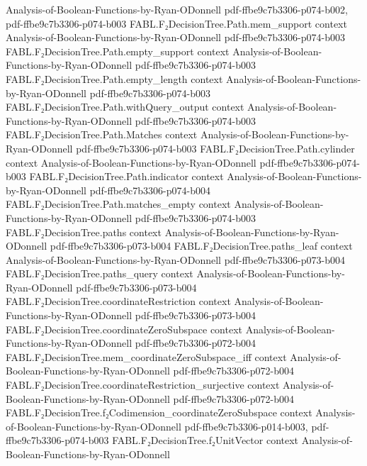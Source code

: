 \begin{theorem}
  {Analysis-of-Boolean-Functions-by-Ryan-ODonnell}
  {pdf-ffbe9c7b3306-p074-b002,
    pdf-ffbe9c7b3306-p074-b003}
\proofstep
  {FABL.F₂DecisionTree.Path.mem_support}
  {context}
  {Analysis-of-Boolean-Functions-by-Ryan-ODonnell}
  {pdf-ffbe9c7b3306-p074-b003}
\proofstep
  {FABL.F₂DecisionTree.Path.empty_support}
  {context}
  {Analysis-of-Boolean-Functions-by-Ryan-ODonnell}
  {pdf-ffbe9c7b3306-p074-b003}
\proofstep
  {FABL.F₂DecisionTree.Path.empty_length}
  {context}
  {Analysis-of-Boolean-Functions-by-Ryan-ODonnell}
  {pdf-ffbe9c7b3306-p074-b003}
\proofstep
  {FABL.F₂DecisionTree.Path.withQuery_output}
  {context}
  {Analysis-of-Boolean-Functions-by-Ryan-ODonnell}
  {pdf-ffbe9c7b3306-p074-b003}
\proofstep
  {FABL.F₂DecisionTree.Path.Matches}
  {context}
  {Analysis-of-Boolean-Functions-by-Ryan-ODonnell}
  {pdf-ffbe9c7b3306-p074-b003}
\proofstep
  {FABL.F₂DecisionTree.Path.cylinder}
  {context}
  {Analysis-of-Boolean-Functions-by-Ryan-ODonnell}
  {pdf-ffbe9c7b3306-p074-b003}
\proofstep
  {FABL.F₂DecisionTree.Path.indicator}
  {context}
  {Analysis-of-Boolean-Functions-by-Ryan-ODonnell}
  {pdf-ffbe9c7b3306-p074-b004}
\proofstep
  {FABL.F₂DecisionTree.Path.matches_empty}
  {context}
  {Analysis-of-Boolean-Functions-by-Ryan-ODonnell}
  {pdf-ffbe9c7b3306-p074-b003}
\proofstep
  {FABL.F₂DecisionTree.paths}
  {context}
  {Analysis-of-Boolean-Functions-by-Ryan-ODonnell}
  {pdf-ffbe9c7b3306-p073-b004}
\proofstep
  {FABL.F₂DecisionTree.paths_leaf}
  {context}
  {Analysis-of-Boolean-Functions-by-Ryan-ODonnell}
  {pdf-ffbe9c7b3306-p073-b004}
\proofstep
  {FABL.F₂DecisionTree.paths_query}
  {context}
  {Analysis-of-Boolean-Functions-by-Ryan-ODonnell}
  {pdf-ffbe9c7b3306-p073-b004}
\proofstep
  {FABL.F₂DecisionTree.coordinateRestriction}
  {context}
  {Analysis-of-Boolean-Functions-by-Ryan-ODonnell}
  {pdf-ffbe9c7b3306-p073-b004}
\proofstep
  {FABL.F₂DecisionTree.coordinateZeroSubspace}
  {context}
  {Analysis-of-Boolean-Functions-by-Ryan-ODonnell}
  {pdf-ffbe9c7b3306-p072-b004}
\proofstep
  {FABL.F₂DecisionTree.mem_coordinateZeroSubspace_iff}
  {context}
  {Analysis-of-Boolean-Functions-by-Ryan-ODonnell}
  {pdf-ffbe9c7b3306-p072-b004}
\proofstep
  {FABL.F₂DecisionTree.coordinateRestriction_surjective}
  {context}
  {Analysis-of-Boolean-Functions-by-Ryan-ODonnell}
  {pdf-ffbe9c7b3306-p072-b004}
\proofstep
  {FABL.F₂DecisionTree.f₂Codimension_coordinateZeroSubspace}
  {context}
  {Analysis-of-Boolean-Functions-by-Ryan-ODonnell}
  {pdf-ffbe9c7b3306-p014-b003,
    pdf-ffbe9c7b3306-p074-b003}
\proofstep
  {FABL.F₂DecisionTree.f₂UnitVector}
  {context}
  {Analysis-of-Boolean-Functions-by-Ryan-ODonnell}

\end{theorem}
